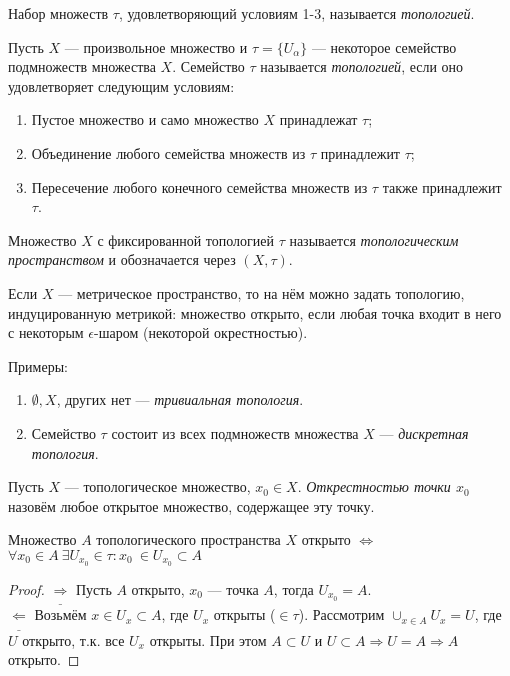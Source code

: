 \begin{definition}
    Набор множеств $\tau$, удовлетворяющий условиям 1-3, называется \textit{топологией}.
\end{definition}

\begin{definition}
    Пусть $X$ — произвольное множество и $\tau = \{U_{\alpha}\}$ — некоторое семейство подмножеств множества $X$. Семейство $\tau$ называется \textit{топологией}, если оно удовлетворяет следующим условиям:
    \begin{enumerate}
        \item Пустое множество и само множество $X$ принадлежат $\tau$;
        \item Объединение любого семейства множеств из $\tau$ принадлежит $\tau$;
        \item Пересечение любого конечного семейства множеств из $\tau$ также принадлежит $\tau$.
    \end{enumerate}
\end{definition}

\begin{definition}
    Множество $X$ с фиксированной топологией $\tau$ называется \textit{топологическим пространством} и обозначается через $(X, \tau)$.
\end{definition}

Если $X$ — метрическое пространство, то на нём можно задать топологию, индуцированную метрикой: множество открыто, если любая точка входит в него с некоторым $\epsilon$-шаром (некоторой окрестностью).

Примеры:
\begin{enumerate}
    \item $\emptyset, X$, других нет — \textit{тривиальная топология}.
    \item Семейство $\tau$ состоит из всех подмножеств множества $X$ — \textit{дискретная топология}.
\end{enumerate}

\begin{definition}
    Пусть $X$ — топологическое множество, $x_0 \in X$. \textit{Открестностью точки $x_0$} назовём любое открытое множество, содержащее эту точку.
\end{definition}

\begin{statement}
    Множество $A$ топологического пространства $X$ открыто $\Leftrightarrow$ $\forall x_0 \in A \ \exists U_{x_0} \in \tau: x_0 \ \in U_{x_0} \subset A$
\end{statement}
\begin{proof}
    $\underline{\Longrightarrow}$ Пусть $A$ открыто, $x_0$ — точка $A$, тогда $U_{x_0} = A$. \\
    $\underline{\Longleftarrow}$ Возьмём $x \in U_x \subset A$, где $U_x$ открыты ($\in \tau$).
    Рассмотрим $\cup_{x \in A} U_x = U$, где $U$ открыто, т.к. все $U_x$ открыты.
    При этом $A \subset U$ и $U \subset A \Rightarrow U = A \Rightarrow A$ открыто.
\end{proof}


